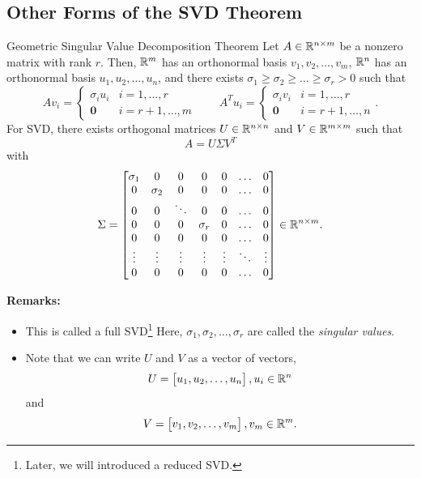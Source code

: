 \documentclass[letterpaper]{article}
\newcommand{\0}{\mathbf{0}}
\begin{document}
\subsection{Other Forms of the SVD Theorem}

\begin{theorem}{Geometric Singular Value Decomposition Theorem}{}
    Let $A \in \mathbb{R}^{n \times m}$ be a nonzero matrix with rank $r$. Then, $\mathbb{R}^m$ has an orthonormal basis $v_1, v_2, \hdots, v_m$, $\mathbb{R}^n$ has an orthonormal basis $u_1, u_2, \hdots, u_n$, and there exists $\sigma_1 \geq \sigma_2 \geq \hdots \geq \sigma_r > 0$ such that 
    \[Av_i = \begin{cases}
        \sigma_i u_i & i = 1, \hdots, r \\ 
        \0 & i = r + 1, \hdots, m
    \end{cases} \qquad A^T u_i = \begin{cases}
        \sigma_i v_i & i = 1, \hdots, r \\ 
        \0 & i = r + 1, \hdots, n
    \end{cases}.\]
    For SVD, there exists orthogonal matrices $U \in \mathbb{R}^{n \times n}$ and $V \in \mathbb{R}^{m \times m}$ such that \[A = U \Sigma V^T\] with \[\Sigma = \begin{bmatrix}
        \sigma_1 & 0 & 0 & 0 & 0 & \hdots & 0 \\ 
        0 & \sigma_2 & 0 & 0 & 0 & \hdots & 0 \\ 
        0 & 0 & \ddots & 0 & 0 & \hdots & 0 \\ 
        0 & 0 & 0 & \sigma_r & 0 & \hdots & 0 \\ 
        0 & 0 & 0 & 0 & 0 & \hdots & 0 \\ 
        \vdots & \vdots & \vdots & \vdots & \vdots & \ddots & \vdots \\ 
        0 & 0 & 0 & 0 & 0 & \hdots & 0
    \end{bmatrix} \in \mathbb{R}^{n \times m}.\]
\end{theorem}
\textbf{Remarks:}
\begin{itemize}
    \item This is called a full SVD\footnote{Later, we will introduced a reduced SVD.} Here, $\sigma_1, \sigma_2, \hdots, \sigma_r$ are called the \emph{singular values}.
    \item Note that we can write $U$ and $V$ as a vector of vectors, 
    \[U = \begin{bmatrix}
        u_1, u_2, \hdots, u_n
    \end{bmatrix}, u_i \in \mathbb{R}^{n}\]
    and \[V = \begin{bmatrix}
        v_1, v_2, \hdots, v_m
    \end{bmatrix}, v_m \in \mathbb{R}^m.\]
\end{itemize}
\end{document}
